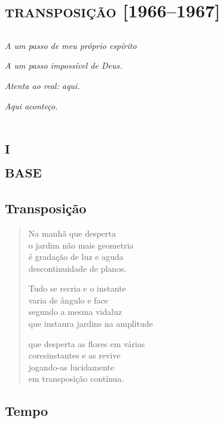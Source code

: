 \part{\textsc{transposição} {[}1966--1967{]}}

\chapter*{}
\thispagestyle{empty}
\mbox{}
\vfill
\hfill\emph{A um passo de meu próprio espírito}

\hfill\emph{A um passo impossível de Deus.}

\hfill\emph{Atenta ao real: aqui.}

\hfill\emph{Aqui aconteço.}

\part*{\textsc{i}\\\textsc{base}}

\chapter{Transposição}

\begin{verse}
Na manhã que desperta\\
o jardim não mais geometria\\
é gradação de luz e aguda\\
descontinuidade de planos.

Tudo se recria e o instante\\
varia de ângulo e face\\
segundo a mesma vidaluz\\
que instaura jardins na amplitude

que desperta as flores em várias\\
coresinstantes e as revive\\
jogando-as lucidamente\\
em transposição contínua.
\end{verse}

\chapter{Tempo}

